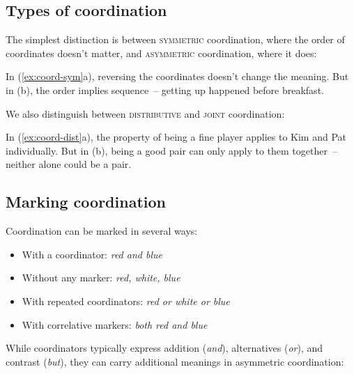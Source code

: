\subsection{Types of coordination}

The simplest distinction is between \textsc{symmetric} coordination, where the order of coordinates doesn't matter, and \textsc{asymmetric} coordination, where it does:

\ea \label{ex:coord-sym}
    \z
\z

In (\ref{ex:coord-sym}a), reversing the coordinates doesn't change the meaning. But in (b), the order implies sequence~-- getting up happened before breakfast.

We also distinguish between \textsc{distributive} and \textsc{joint} coordination:

\ea \label{ex:coord-dist}
    \z
\z

In (\ref{ex:coord-dist}a), the property of being a fine player applies to Kim and Pat individually. But in (b), being a good pair can only apply to them together~-- neither alone could be a pair.

\subsection{Marking coordination}

Coordination can be marked in several ways:
\begin{itemize}[noitemsep]
    \item With a coordinator: \textit{red and blue}
    \item Without any marker: \textit{red, white, blue}
    \item With repeated coordinators: \textit{red or white or blue}
    \item With correlative markers: \textit{both red and blue}
\end{itemize}

While coordinators typically express addition (\textit{and}), alternatives (\textit{or}), and contrast (\textit{but}), they can carry additional meanings in asymmetric coordination:

